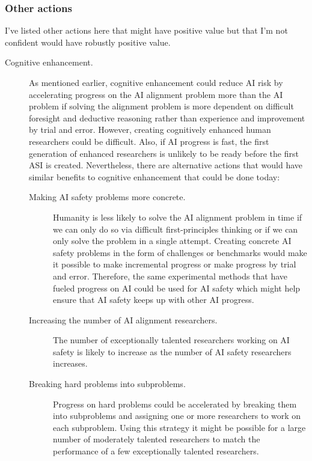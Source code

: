 \documentclass{article}
\begin{document}
\subsubsection{Other actions}

I’ve listed other actions here that might have positive value but that I’m not confident would have robustly positive value.

\begin{description}
\item[Cognitive enhancement.] As mentioned earlier, cognitive enhancement could reduce AI risk by accelerating progress on the AI alignment problem more than the AI problem if solving the alignment problem is more dependent on difficult foresight and deductive reasoning rather than experience and improvement by trial and error. However, creating cognitively enhanced human researchers could be difficult. Also, if AI progress is fast, the first generation of enhanced researchers is unlikely to be ready before the first ASI is created. Nevertheless, there are alternative actions that would have similar benefits to cognitive enhancement that could be done today:
\begin{description}
\item[Making AI safety problems more concrete.] Humanity is less likely to solve the AI alignment problem in time if we can only do so via difficult first-principles thinking or if we can only solve the problem in a single attempt. Creating concrete AI safety problems in the form of challenges or benchmarks would make it possible to make incremental progress or make progress by trial and error. Therefore, the same experimental methods that have fueled progress on AI could be used for AI safety which might help ensure that AI safety keeps up with other AI progress.
\item[Increasing the number of AI alignment researchers.] The number of exceptionally talented researchers working on AI safety is likely to increase as the number of AI safety researchers increases.
\item[Breaking hard problems into subproblems.] Progress on hard problems could be accelerated by breaking them into subproblems and assigning one or more researchers to work on each subproblem. Using this strategy it might be possible for a large number of moderately talented researchers to match the performance of a few exceptionally talented researchers.
\end{description}

\end{description}
\end{document}
